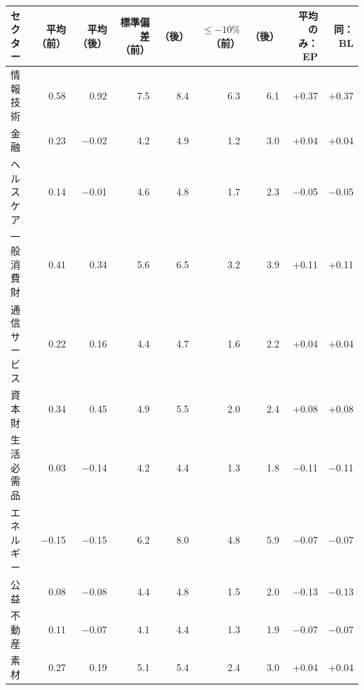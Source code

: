 \begin{tabular}{lrrrrrrrr}
\toprule
セクター & 平均（前） & 平均（後） & 標準偏差（前） & （後） & $\le-10\%$（前） & （後） & 平均のみ：EP & 同：BL \\
\midrule
情報技術 & 0.58 & 0.92 & 7.5 & 8.4 & 6.3 & 6.1 & +0.37 & +0.37 \\
金融 & 0.23 & \ensuremath{-}0.02 & 4.2 & 4.9 & 1.2 & 3.0 & +0.04 & +0.04 \\
ヘルスケア & 0.14 & \ensuremath{-}0.01 & 4.6 & 4.8 & 1.7 & 2.3 & \ensuremath{-}0.05 & \ensuremath{-}0.05 \\
一般消費財 & 0.41 & 0.34 & 5.6 & 6.5 & 3.2 & 3.9 & +0.11 & +0.11 \\
通信サービス & 0.22 & 0.16 & 4.4 & 4.7 & 1.6 & 2.2 & +0.04 & +0.04 \\
資本財 & 0.34 & 0.45 & 4.9 & 5.5 & 2.0 & 2.4 & +0.08 & +0.08 \\
生活必需品 & 0.03 & \ensuremath{-}0.14 & 4.2 & 4.4 & 1.3 & 1.8 & \ensuremath{-}0.11 & \ensuremath{-}0.11 \\
エネルギー & \ensuremath{-}0.15 & \ensuremath{-}0.15 & 6.2 & 8.0 & 4.8 & 5.9 & \ensuremath{-}0.07 & \ensuremath{-}0.07 \\
公益 & 0.08 & \ensuremath{-}0.08 & 4.4 & 4.8 & 1.5 & 2.0 & \ensuremath{-}0.13 & \ensuremath{-}0.13 \\
不動産 & 0.11 & \ensuremath{-}0.07 & 4.1 & 4.4 & 1.3 & 1.9 & \ensuremath{-}0.07 & \ensuremath{-}0.07 \\
素材 & 0.27 & 0.19 & 5.1 & 5.4 & 2.4 & 3.0 & +0.04 & +0.04 \\
\bottomrule
\end{tabular}
